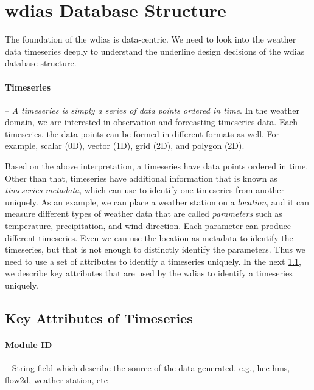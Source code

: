 \section{\acrshort{wdias} Database Structure}
\label{se:db_struct}

The foundation of the \acrshort{wdias} is data-centric. We need to look into the weather data timeseries deeply to understand the underline design decisions of the \acrshort{wdias} database structure.

\paragraph{Timeseries}-- \emph{A timeseries is simply a series of data points ordered in time}. In the weather domain, we are interested in observation and forecasting timeseries data. Each timeseries, the data points can be formed in different formats as well. For example, scalar (0D), vector (1D), grid (2D), and polygon (2D).

Based on the above interpretation, a timeseries have data points ordered in time. Other than that, timeseries have additional information that is known as \emph{timeseries metadata}, which can use to identify one timeseries from another uniquely. As an example, we can place a weather station on a \emph{location}, and it can measure different types of weather data that are called \emph{parameters} such as temperature, precipitation, and wind direction. Each parameter can produce different timeseries. Even we can use the location as metadata to identify the timeseries, but that is not enough to distinctly identify the parameters. Thus we need to use a set of attributes to identify a timeseries uniquely. In the next \cref{subse:timeseries_key_attributes}, we describe key attributes that are used by the \acrshort{wdias} to identify a timeseries uniquely.


\subsection{Key Attributes of Timeseries}
\label{subse:timeseries_key_attributes}
\paragraph{Module ID}-- String field which describe the source of the data generated. e.g., hec-hms, flow2d, weather-station, etc


